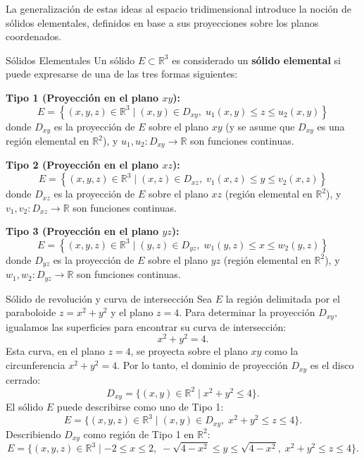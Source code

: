 \documentclass[11pt,a4paper]{article}
\begin{document}
La generalización de estas ideas al espacio tridimensional introduce la noción de sólidos elementales, definidos en base a sus proyecciones sobre los planos coordenados.

\begin{definicionbox}{Sólidos Elementales}
Un sólido $E \subset \mathbb{R}^3$ es considerado un \textbf{sólido elemental} si puede expresarse de una de las tres formas siguientes:

\textbf{Tipo 1 (Proyección en el plano $xy$):}
\[
E = \left\{ (x,y,z) \in \mathbb{R}^3 \mid (x,y) \in D_{xy}, \; u_1(x,y) \leq z \leq u_2(x,y) \right\}
\]
donde $D_{xy}$ es la proyección de $E$ sobre el plano $xy$ (y se asume que $D_{xy}$ es una región elemental en $\mathbb{R}^2$), y $u_1, u_2 : D_{xy} \to \mathbb{R}$ son funciones continuas.

\textbf{Tipo 2 (Proyección en el plano $xz$):}
\[
E = \left\{ (x,y,z) \in \mathbb{R}^3 \mid (x,z) \in D_{xz}, \; v_1(x,z) \leq y \leq v_2(x,z) \right\}
\]
donde $D_{xz}$ es la proyección de $E$ sobre el plano $xz$ (región elemental en $\mathbb{R}^2$), y $v_1, v_2 : D_{xz} \to \mathbb{R}$ son funciones continuas.

\textbf{Tipo 3 (Proyección en el plano $yz$):}
\[
E = \left\{ (x,y,z) \in \mathbb{R}^3 \mid (y,z) \in D_{yz}, \; w_1(y,z) \leq x \leq w_2(y,z) \right\}
\]
donde $D_{yz}$ es la proyección de $E$ sobre el plano $yz$ (región elemental en $\mathbb{R}^2$), y $w_1, w_2 : D_{yz} \to \mathbb{R}$ son funciones continuas.
\end{definicionbox}

\begin{ejemplobox}{Sólido de revolución y curva de intersección}
Sea $E$ la región delimitada por el paraboloide $z = x^2 + y^2$ y el plano $z = 4$.
Para determinar la proyección $D_{xy}$, igualamos las superficies para encontrar su curva de intersección:
\[
x^2 + y^2 = 4.
\]
Esta curva, en el plano $z=4$, se proyecta sobre el plano $xy$ como la circunferencia $x^2 + y^2 = 4$. Por lo tanto, el dominio de proyección $D_{xy}$ es el disco cerrado:
\[
D_{xy} = \{ (x,y) \in \mathbb{R}^2 \mid x^2 + y^2 \leq 4 \}.
\]
El sólido $E$ puede describirse como uno de Tipo 1:
\[
E = \{ (x,y,z) \in \mathbb{R}^3 \mid (x,y) \in D_{xy}, \; x^2 + y^2 \leq z \leq 4 \}.
\]
Describiendo $D_{xy}$ como región de Tipo 1 en $\mathbb{R}^2$:
\[
E = \{ (x,y,z) \in \mathbb{R}^3 \mid -2 \leq x \leq 2, \; -\sqrt{4-x^2} \leq y \leq \sqrt{4-x^2}, \; x^2+y^2 \leq z \leq 4 \}.
\]
\begin{center}
\end{center}
\end{ejemplobox}
\end{document}
